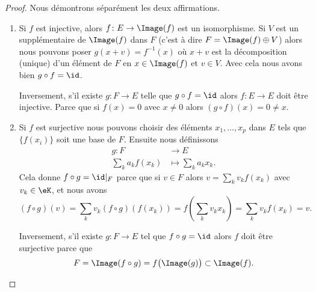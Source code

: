 \begin{proof}
    Nous démontrons séparément les deux affirmations.
    \begin{enumerate}
        \item
            Si \( f\) est injective, alors \( f\colon E\to \Image(f)\) est un isomorphisme. Si $V$ est un supplémentaire de \( \Image(f)\) dans \( F\) (c'est à dire \( F=\Image(f)\oplus V\)) alors nous pouvons poser \( g(x+v)=f^{-1}(x)\) où \( x+v\) est la décomposition (unique) d'un élément de \( F\) en \( x\in\Image(f)\) et \( v\in V\). Avec cela nous avons bien \( g\circ f=\id\).

            Inversement, s'il existe \( g\colon F\to E\) telle que \( g\circ f=\id\) alors \( f\colon E\to E\) doit être injective. Parce que si \( f(x)=0\) avec \( x\neq 0\) alors \( (g\circ f)(x)=0\neq x\).
        \item
            Si \( f\) est surjective nous pouvons choisir des éléments \( x_1,\ldots, x_p\) dans \( E\) tels que \( \{ f(x_i) \}\) soit une base de \( F\). Ensuite nous définissons
            \begin{equation}
                \begin{aligned}
                    g\colon F&\to E \\
                    \sum_k a_k f(x_k)&\mapsto \sum_k a_k x_k.
                \end{aligned}
            \end{equation}
            Cela donne \(  f\circ g=\id|_F\) parce que si \( v\in F\) alors \( v=\sum_kv_kf(x_k)\) avec \( v_k\in \eK\), et nous avons
            \begin{equation}
                (f\circ g)(v)=\sum_k v_k (f\circ g) \left(f(x_k)\right)
                             =f\left( \sum_k v_k x_k \right)
                             =\sum_k v_k f(x_k) = v.
            \end{equation}

            Inversement, s'il existe \( g\colon F\to E\) tel que \( f\circ g=\id\) alors \( f\) doit être surjective parce que
            \begin{equation}
                F=\Image(f\circ g)=f\big( \Image(g) \big)\subset \Image(f).
            \end{equation}
    \end{enumerate}
\end{proof}


